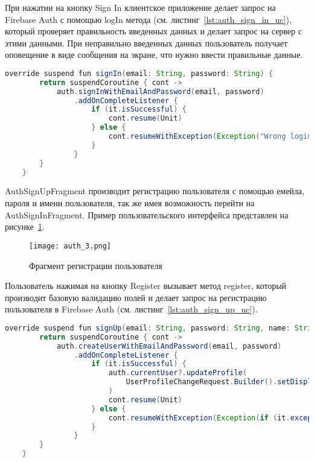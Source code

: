 При нажатии на кнопку Sign In клиентское приложение делает запрос на Firebase Auth с помощью logIn метода (см. листинг~\ref{lst:auth_sign_in_uc}), который проверяет правильность введенных данных и делает запрос на сервер с этими данными. При неправильно введенных данных пользователь получает оповещение в виде сообщения на экране, что нужно ввести правильные данные.

\begin{lstlisting}[language=Java,label={lst:auth_sign_in_uc},caption={SignIn}]
    override suspend fun signIn(email: String, password: String) {
        return suspendCoroutine { cont ->
            auth.signInWithEmailAndPassword(email, password)
                .addOnCompleteListener {
                    if (it.isSuccessful) {
                        cont.resume(Unit)
                    } else {
                        cont.resumeWithException(Exception("Wrong login or password"))
                    }
                }
        }
    }
\end{lstlisting}

AuthSignUpFragment производит регистрацию пользователя с помощью емейла, пароля и имени пользователя, так же имея возможность перейти на AuthSignInFragment. Пример пользовательского интерфейса представлен на рисунке~\ref{fig:arch:auth_3}.

\begin{figure}[H]
 \centering
   \texttt{[image: auth\_3.png]} 
   \caption{Фрагмент регистрации пользователя}
   \label{fig:arch:auth_3}
\end{figure}

Пользователь нажимая на кнопку Register вызывает метод register, который производит базовую валидацию полей и делает запрос на регистрацию пользователя в Firebase Auth (см. листинг~\ref{lst:auth_sign_up_uc}).
\begin{lstlisting}[language=Java,label={lst:auth_sign_up_uc},caption={SignUp}]
    override suspend fun signUp(email: String, password: String, name: String) {
        return suspendCoroutine { cont ->
            auth.createUserWithEmailAndPassword(email, password)
                .addOnCompleteListener {
                    if (it.isSuccessful) {
                        auth.currentUser?.updateProfile(
                            UserProfileChangeRequest.Builder().setDisplayName(name).build()
                        )
                        cont.resume(Unit)
                    } else {
                        cont.resumeWithException(Exception(if (it.exception != null) it.exception!!.message else "Wrong login or password"))
                    }
                }
        }
    }
\end{lstlisting}

